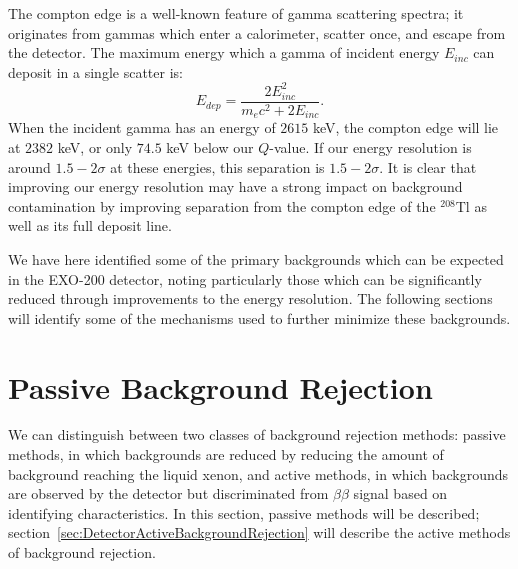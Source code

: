 The compton edge is a well-known feature of gamma scattering spectra; it originates from gammas which enter a calorimeter, scatter once, and escape from the detector.  The maximum energy which a gamma of incident energy $E_{inc}$ can deposit in a single scatter is:~\cite{Compton}
\begin{equation}
E_{dep} = \frac{2E_{inc}^2}{m_e c^2 + 2E_{inc}}.
\end{equation}
When the incident gamma has an energy of $2615$ keV, the compton edge will lie at $2382$ keV, or only $74.5$ keV below our $Q$-value.  If our energy resolution is around $1.5-2\sigma$ at these energies, this separation is $1.5-2\sigma$.  It is clear that improving our energy resolution may have a strong impact on background contamination by improving separation from the compton edge of the $^{208}$Tl as well as its full deposit line.

We have here identified some of the primary backgrounds which can be expected in the EXO-200 detector, noting particularly those which can be significantly reduced through improvements to the energy resolution.  The following sections will identify some of the mechanisms used to further minimize these backgrounds.

\section{Passive Background Rejection}\label{sec:DetectorPassiveBackgroundRejection}

We can distinguish between two classes of background rejection methods: passive methods, in which backgrounds are reduced by reducing the amount of background reaching the liquid xenon, and active methods, in which backgrounds are observed by the detector but discriminated from $\beta\beta$ signal based on identifying characteristics.  In this section, passive methods will be described; section~\ref{sec:DetectorActiveBackgroundRejection} will describe the active methods of background rejection.

